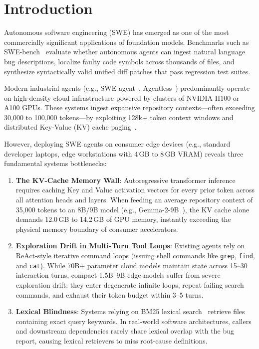 \section{Introduction}
\label{sec:intro}

Autonomous software engineering (SWE) has emerged as one of the most commercially significant applications of foundation models. Benchmarks such as SWE-bench~\cite{jimenez2024swebench} evaluate whether autonomous agents can ingest natural language bug descriptions, localize faulty code symbols across thousands of files, and synthesize syntactically valid unified diff patches that pass regression test suites.

Modern industrial agents (e.g., SWE-agent~\cite{yang2024sweagent}, Agentless~\cite{xia2024agentless}) predominantly operate on high-density cloud infrastructure powered by clusters of NVIDIA H100 or A100 GPUs. These systems ingest expansive repository contexts---often exceeding 30,000 to 100,000 tokens---by exploiting 128k+ token context windows and distributed Key-Value (KV) cache paging~\cite{kwon2023vllm}.

However, deploying SWE agents on consumer edge devices (e.g., standard developer laptops, edge workstations with 4\,GB to 8\,GB VRAM) reveals three fundamental systems bottlenecks:
\begin{enumerate}
    \item \textbf{The KV-Cache Memory Wall}: Autoregressive transformer inference requires caching Key and Value activation vectors for every prior token across all attention heads and layers. When feeding an average repository context of 35,000 tokens to an 8B/9B model (e.g., Gemma-2-9B~\cite{gemmateam2024gemma2}), the KV cache alone demands 12.0\,GB to 14.2\,GB of GPU memory, instantly exceeding the physical memory boundary of consumer accelerators.
    \item \textbf{Exploration Drift in Multi-Turn Tool Loops}: Existing agents rely on ReAct-style iterative command loops (issuing shell commands like \texttt{grep}, \texttt{find}, and \texttt{cat}). While 70B+ parameter cloud models maintain state across 15--30 interaction turns, compact 1.5B--9B edge models suffer from severe exploration drift: they enter degenerate infinite loops, repeat failing search commands, and exhaust their token budget within 3--5 turns.
    \item \textbf{Lexical Blindness}: Systems relying on BM25 lexical search~\cite{xia2024agentless} retrieve files containing exact query keywords. In real-world software architectures, callers and downstream dependencies rarely share lexical overlap with the bug report, causing lexical retrievers to miss root-cause definitions.
\end{enumerate}

